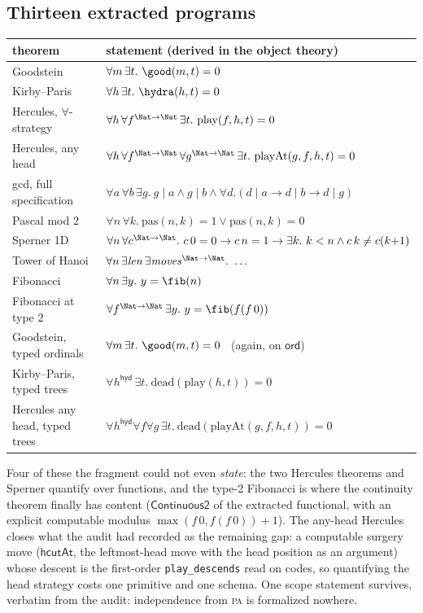 \subsection*{Thirteen extracted programs}

\begin{center}\small
\begin{tabular}{ll}
\toprule
theorem & statement (derived in the object theory)\\
\midrule
Goodstein & $\forall m\,\exists t.\ \good(m,t)=0$\\
Kirby--Paris & $\forall h\,\exists t.\ \hydra(h,t)=0$\\
Hercules, $\forall$-strategy & $\forall h\,\forall f^{\Nat\to\Nat}\,\exists t.\ \mathrm{play}(f,h,t)=0$\\
Hercules, any head & $\forall h\,\forall f^{\Nat\to\Nat}\,\forall g^{\Nat\to\Nat}\,\exists t.\ \mathrm{playAt}(g,f,h,t)=0$\\
gcd, full specification & $\forall a\,\forall b\,\exists g.\ g\mid a \land g\mid b \land \forall d.(d\mid a\to d\mid b\to d\mid g)$\\
Pascal mod 2 & $\forall n\,\forall k.\ \mathrm{pas}(n,k)=1 \lor \mathrm{pas}(n,k)=0$\\
Sperner 1D & $\forall n\,\forall c^{\Nat\to\Nat}.\ c\,0=0 \to c\,n=1 \to \exists k.\ k<n \land c\,k\neq c(k{+}1)$\\
Tower of Hanoi & $\forall n\,\exists \mathit{len}\,\exists \mathit{moves}^{\Nat\to\Nat}.\ \dots$\\
Fibonacci & $\forall n\,\exists y.\ y=\fib(n)$\\
Fibonacci at type 2 & $\forall f^{\Nat\to\Nat}\,\exists y.\ y=\fib(f(f\,0))$\\
Goodstein, typed ordinals & $\forall m\,\exists t.\ \good(m,t)=0$ \ (again, on $\mathsf{ord}$)\\
Kirby--Paris, typed trees & $\forall h^{\mathsf{hyd}}\,\exists t.\ \mathrm{dead}(\mathrm{play}(h,t))=0$\\
Hercules any head, typed trees & $\forall h^{\mathsf{hyd}}\forall f\forall g\,\exists t.\ \mathrm{dead}(\mathrm{playAt}(g,f,h,t))=0$\\
\bottomrule
\end{tabular}
\end{center}

Four of these the fragment could not even \emph{state}: the two Hercules
theorems and Sperner quantify over functions, and the type-2 Fibonacci is
where the continuity theorem finally has content ($\mathsf{Continuous2}$ of
the extracted functional, with an explicit computable modulus
$\max(f\,0, f(f\,0))+1$). The any-head Hercules closes what the audit had
recorded as the remaining gap: a computable surgery move ($\mathsf{hcutAt}$,
the leftmost-head move with the head position as an argument) whose descent
is the first-order \texttt{play\_descends} read on codes, so quantifying
the head strategy costs one primitive and one schema. One scope statement
survives, verbatim from the audit: independence from \textsc{pa} is
formalized nowhere.

